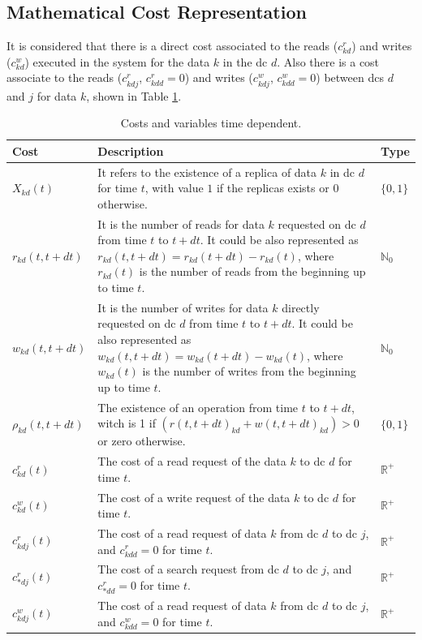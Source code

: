 \documentclass{acm_proc_article-sp}
\begin{document}
\subsection{Mathematical Cost Representation} \label{sec:math_cost_representation}
It is considered that there is a direct cost associated to the reads ($c^{r}_{kd}$) and writes ($c^{w}_{kd}$) executed in the system for the data $k$ in the \gls{dc} $d$. Also there is a cost associate to the reads ($c^{r}_{kdj}$, $c^{r}_{kdd} = 0$) and writes ($c^{w}_{kdj}$, $c^{w}_{kdd} = 0$) between \glspl{dc} $d$ and $j$ for data $k$, shown in Table \ref{tb:costs}.
\begin{table}[ht!]
	\begin{center}
		\begin{tabular}{|l|p{13.6cm}|l|}
			\hline
			Cost                         & Description & Type \\
			\hline
			\hline
			$X_{kd}(t)$            & It refers to the existence of a replica of data $k$ in \gls{dc} $d$ for time $t$, with value $1$ if the replicas exists or $0$ otherwise. & $\{0, 1\}$\\
			\hline
			$r_{kd}(t, t+dt)$       & It is the number of reads for data $k$ requested on \gls{dc} $d$ from time $t$ to $t+dt$. It could be also represented as $r_{kd}(t, t+dt) = r_{kd}(t+dt) - r_{kd}(t)$, where $r_{kd}(t)$ is the number of reads from the beginning up to time $t$. & $\mathbb{N}_{0}$ \\
			\hline
			$w_{kd}(t, t+dt)$      & It is the number of writes for data $k$ directly requested on \gls{dc} $d$ from time $t$ to $t+dt$. It could be also represented as $w_{kd}(t, t+dt) = w_{kd}(t+dt) - w_{kd}(t)$, where $w_{kd}(t)$ is the number of writes from the beginning up to time $t$. & $\mathbb{N}_{0}$ \\
			\hline
			$\rho_{kd}(t, t+dt) $ & The existence of an operation from time $t$ to $t+dt$, witch is 1 if $(r(t, t+dt)_{kd} + w(t, t+dt)_{kd}) > 0$ or zero otherwise. & $\{0, 1\}$ \\
			\hline
			$c^{r}_{kd}(t)$           & The cost of a read request of the data $k$ to \gls{dc} $d$ for time $t$. & $\mathbb{R}^{+}$ \\
			\hline
			$c^{w}_{kd}(t)$          & The cost of a write request of the data $k$ to \gls{dc} $d$ for time $t$. & $\mathbb{R}^{+}$ \\
			\hline
			$c^{r}_{kdj}(t)$           & The cost of a read request of data $k$ from \gls{dc} $d$ to \gls{dc} $j$, and $c^{r}_{kdd} = 0$ for time $t$. & $\mathbb{R}^{+}$ \\
			\hline
			$c^{r}_{*dj}(t)$           & The cost of a search request from \gls{dc} $d$ to \gls{dc} $j$, and $c^{r}_{*dd} = 0$ for time $t$. & $\mathbb{R}^{+}$ \\
			\hline
			$c^{w}_{kdj}(t)$         & The cost of a read request of data $k$ from \gls{dc} $d$ to \gls{dc} $j$, and $c^{w}_{kdd} = 0$ for time $t$. & $\mathbb{R}^{+}$ \\
			\hline
		\end{tabular}
	\end{center}

	\caption{Costs and variables time dependent.}
	\label{tb:costs}
\end{table}
\end{document}
